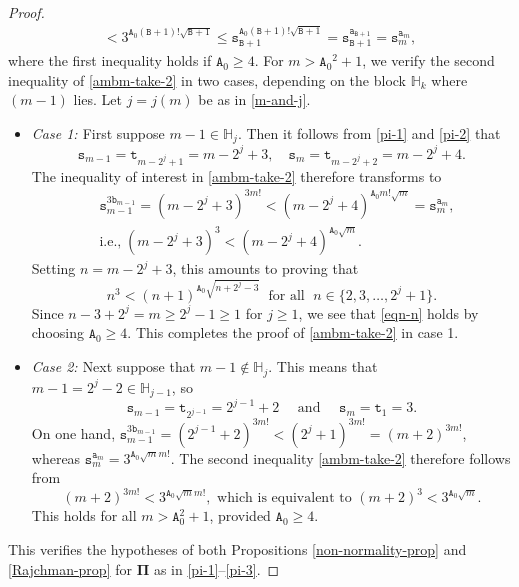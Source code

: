\documentclass[12pt, twoside]{article}
\theoremstyle{definition}
\numberwithin{equation}{section}
\begin{document}
\begin{proof}
\begin{align*}
	< 3 ^ { \mathtt A_0 (\mathtt B + 1)!\sqrt{\mathtt B + 1 } }
	\le \mathtt s_{\mathtt B +1} ^ { \mathtt A_0 (\mathtt B + 1)!\sqrt{\mathtt B + 1 } } = \mathtt s_{\mathtt B +1} ^ {\mathtt a_{\mathtt B +1}} = \mathtt s_m^{\mathtt a_m},
\end{align*} 
where the first inequality holds if $\mathtt A_0 \geq 4$. For $m > {\mathtt A_0}^2+1$, 
we verify the second inequality of \eqref{ambm-take-2} in two cases, depending on the block $\mathbb H_k$ where $(m-1)$ lies. Let $j=j(m)$ be as in \eqref{m-and-j}.  
\begin{itemize} 
\item {\em{Case 1: }} First suppose $m-1 \in \mathbb H_j$. Then it follows from \eqref{pi-1} and \eqref{pi-2} that 
\[ \mathtt s_{m-1} = \mathtt t_{m-2^j + 1} = m - 2^j + 3, \quad \mathtt s_m = \mathtt t_{m - 2^j + 2} = m - 2^j + 4.\] The inequality of interest in \eqref{ambm-take-2} therefore transforms to 
\begin{align*} 
&\mathtt s_{m-1}^{3 \mathtt b_{m-1}} = (m - 2^j + 3)^{3m!} < (m - 2^j +4)^{\mathtt A_0 m!\sqrt{m}} = \mathtt s_{m}^{\mathtt a_m}, \\  &\text{i.e.,} \; (m - 2^j + 3)^3 < (m - 2^j +4)^{\mathtt A_0 \sqrt{m}}.
\end{align*}
Setting $ n = m- 2^j + 3$, this amounts to proving that  
\begin{equation} \label{eqn-n} n^3 < (n + 1)^{\mathtt A_0 \sqrt{n + 2^j-3}} \; \text{ for all } \; n \in \bigl\{2, 3, \ldots, 2^j+1 \bigr\}. \end{equation}  
Since $n - 3 + 2^j = m \geq 2^j - 1\geq 1$ for $j \geq 1$, we see that \eqref{eqn-n} holds by choosing $\mathtt A_0 \geq 4$. This completes the proof of \eqref{ambm-take-2} in case 1. 
\item {\em{Case 2: }} Next suppose that $m-1 \notin \mathbb H_j$. This means that $m-1 = 2^{j} - 2 \in \mathbb H_{j-1}$, so
\[ \mathtt s_{m-1} = \mathtt t_{2^{j-1}} = 2^{j-1}+2 \quad \text{ and } \quad \mathtt s_m = \mathtt t_1 = 3. \]  
On one hand, $\mathtt s_{m-1}^{3\mathtt b_{m-1}} = (2^{j-1} + 2)^{3m!} < (2^j + 1)^{3m!} = (m+2)^{3 m!}$, whereas $\mathtt s_m^{\mathtt a_m} = 3^{\mathtt A_0 \sqrt{m} m!}$. The second inequality \eqref{ambm-take-2} therefore follows from 
\[ (m+2)^{3m!} < 3^{\mathtt A_0 \sqrt{m} m!}, \text{ which is equivalent to } (m+2)^3 < 3^{\mathtt A_0 \sqrt{m}}.\]
This holds for all $m > \mathtt A_0^2+1$, provided $\mathtt A_0 \geq 4$. 
\end{itemize}
This verifies the hypotheses of both Propositions \ref{non-normality-prop} and \ref{Rajchman-prop} for $\pmb{\Pi}$ as in \eqref{pi-1}--\eqref{pi-3}.  
\end{proof} 
\end{document}
